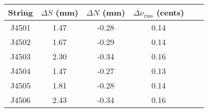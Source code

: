 \begin{tabular}{cccccc}
\toprule
String & $\Delta S$ (mm) & $\Delta N$ (mm) & $\overline{\Delta \nu}_\text{rms}$ (cents) \\
\midrule
J4501 & 1.47 & -0.28 & 0.14 \\
J4502 & 1.67 & -0.29 & 0.14 \\
J4503 & 2.30 & -0.34 & 0.16 \\
J4504 & 1.47 & -0.27 & 0.13 \\
J4505 & 1.81 & -0.28 & 0.14 \\
J4506 & 2.43 & -0.34 & 0.16 \\
\bottomrule
\end{tabular}

